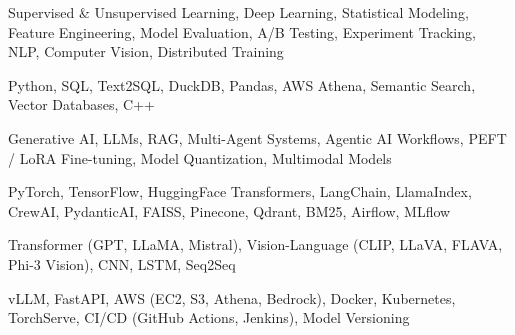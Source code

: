 \documentclass[letter,10pt]{article}
\begin{document}
 Supervised \& Unsupervised Learning, Deep Learning, Statistical Modeling, Feature Engineering, Model Evaluation, A/B Testing, Experiment Tracking, NLP, Computer Vision, Distributed Training\par\vspace{2pt}

 Python, SQL, Text2SQL, DuckDB, Pandas, AWS Athena, Semantic Search, Vector Databases, C++\par\vspace{2pt}

 Generative AI, LLMs, RAG, Multi-Agent Systems, Agentic AI Workflows, PEFT / LoRA Fine-tuning, Model Quantization, Multimodal Models\par\vspace{2pt}

 PyTorch, TensorFlow, HuggingFace Transformers, LangChain, LlamaIndex, CrewAI, PydanticAI, FAISS, Pinecone, Qdrant, BM25, Airflow, MLflow\par\vspace{2pt}

 Transformer (GPT, LLaMA, Mistral), Vision-Language (CLIP, LLaVA, FLAVA, Phi-3 Vision), CNN, LSTM, Seq2Seq\par\vspace{2pt}

 vLLM, FastAPI, AWS (EC2, S3, Athena, Bedrock), Docker, Kubernetes, TorchServe, CI/CD (GitHub Actions, Jenkins), Model Versioning
\end{document}
